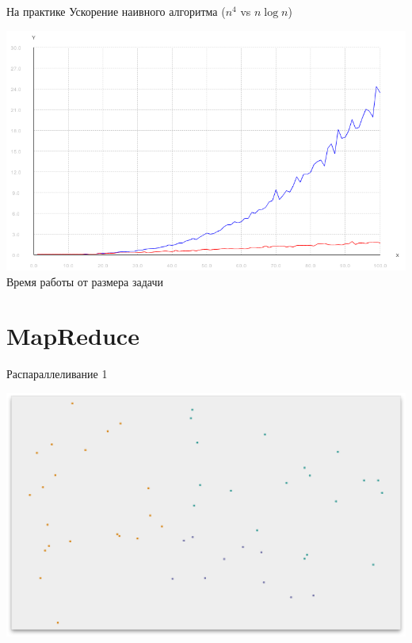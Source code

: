 \documentclass[14pt, fleqn, xcolor={dvipsnames, table}]{beamer}
\begin{document}
        \begin{frame}{На практике}
            Ускорение наивного алгоритма  ($n^4$ vs $n\log n$)
            \begin{center}
                \includegraphics[scale=0.35]{comparison.png}\\
                Время работы от размера задачи   
            \end{center}  
                  
        \end{frame}
        
    \section{MapReduce}
        
        \begin{frame}{Распараллеливание 1}
            \begin{center}
                \includegraphics[scale=0.295]{4.png}
            \end{center}             
        \end{frame}
        
\end{document}
